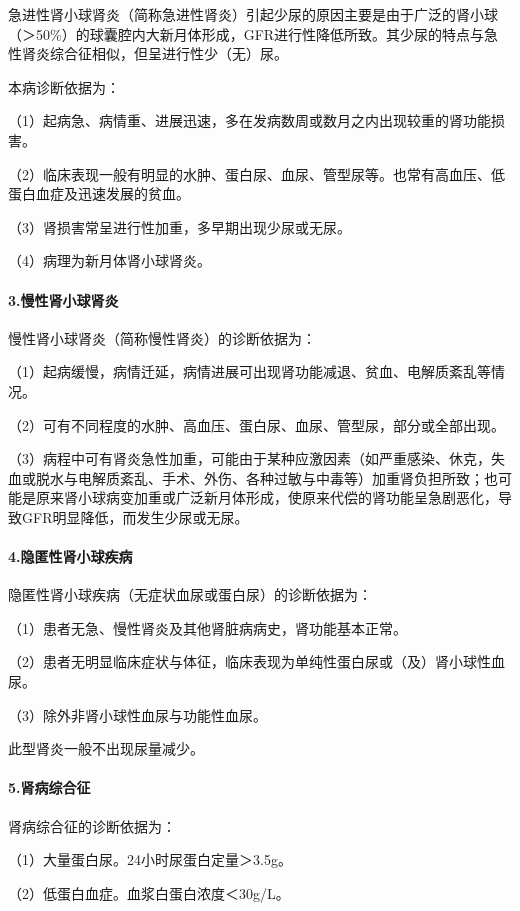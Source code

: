 急进性肾小球肾炎（简称急进性肾炎）引起少尿的原因主要是由于广泛的肾小球（＞50\%）的球囊腔内大新月体形成，GFR进行性降低所致。其少尿的特点与急性肾炎综合征相似，但呈进行性少（无）尿。

本病诊断依据为：

（1）起病急、病情重、进展迅速，多在发病数周或数月之内出现较重的肾功能损害。

（2）临床表现一般有明显的水肿、蛋白尿、血尿、管型尿等。也常有高血压、低蛋白血症及迅速发展的贫血。

（3）肾损害常呈进行性加重，多早期出现少尿或无尿。

（4）病理为新月体肾小球肾炎。

\paragraph{3.慢性肾小球肾炎}

慢性肾小球肾炎（简称慢性肾炎）的诊断依据为：

（1）起病缓慢，病情迁延，病情进展可出现肾功能减退、贫血、电解质紊乱等情况。

（2）可有不同程度的水肿、高血压、蛋白尿、血尿、管型尿，部分或全部出现。

（3）病程中可有肾炎急性加重，可能由于某种应激因素（如严重感染、休克，失血或脱水与电解质紊乱、手术、外伤、各种过敏与中毒等）加重肾负担所致；也可能是原来肾小球病变加重或广泛新月体形成，使原来代偿的肾功能呈急剧恶化，导致GFR明显降低，而发生少尿或无尿。

\paragraph{4.隐匿性肾小球疾病}

隐匿性肾小球疾病（无症状血尿或蛋白尿）的诊断依据为：

（1）患者无急、慢性肾炎及其他肾脏病病史，肾功能基本正常。

（2）患者无明显临床症状与体征，临床表现为单纯性蛋白尿或（及）肾小球性血尿。

（3）除外非肾小球性血尿与功能性血尿。

此型肾炎一般不出现尿量减少。

\paragraph{5.肾病综合征}

肾病综合征的诊断依据为：

（1）大量蛋白尿。24小时尿蛋白定量＞3.5g。

（2）低蛋白血症。血浆白蛋白浓度＜30g/L。

